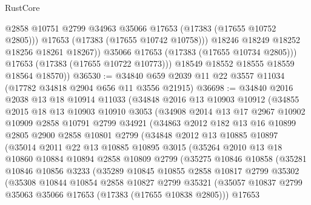 \begin{lexlean}{RustCore}
\begin{coremodule}
                    @2858
                    @10751
                    @2799
                    @34963
                    @35066
                    @17653
                    (@17383 (@17655 @10752 @2805)))
                  @17653
                  (@17383 (@17655 @10742 @10758)))
                @18246
                @18249
                @18252
                @18256
                @18261
                @18267))
            @35066
            @17653
            (@17383 (@17655 @10734 @2805)))
          @17653
          (@17383 (@17655 @10722 @10773)))
        @18549
        @18552
        @18555
        @18559
        @18564
        @18570))
@36530 := @34840 @659 @2039 @11 @22 @3557 @11034 (@17782 @34818 @2904 @656 @11 @3556 @21915)
@36698 := @34840
    @2016
    @2038
    @13
    @18
    @10914
    @11033
    (@34848
      @2016
      @13
      @10903
      @10912
      (@34855
        @2015
        @18
        @13
        @10903
        @10910
        @3053
        (@34908
          @2014
          @13
          @17
          @2967
          @10902
          @10909
          @2858
          @10791
          @2799
          @34921
          (@34863
            @2012
            @182
            @13
            @16
            @10899
            @2805
            @2900
            @2858
            @10801
            @2799
            (@34848
              @2012
              @13
              @10885
              @10897
              (@35014
                @2011
                @22
                @13
                @10885
                @10895
                @3015
                (@35264
                  @2010
                  @13
                  @18
                  @10860
                  @10884
                  @10894
                  @2858
                  @10809
                  @2799
                  (@35275
                    @10846
                    @10858
                    (@35281
                      @10846
                      @10856
                      @3233
                      (@35289
                        @10845
                        @10855
                        @2858
                        @10817
                        @2799
                        @35302
                        (@35308
                          @10844
                          @10854
                          @2858
                          @10827
                          @2799
                          @35321
                          (@35057 @10837 @2799 @35063 @35066 @17653 (@17383 (@17655 @10838 @2805)))
                          @17653

\end{coremodule}
\end{lexlean}
